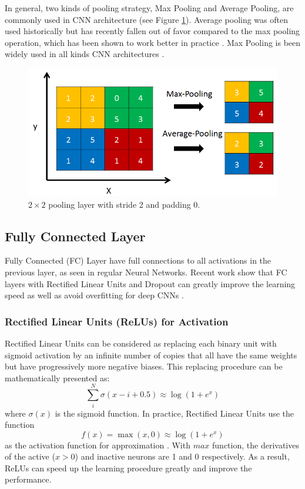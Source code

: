 In general, two kinds of pooling strategy, Max Pooling and Average Pooling, are commonly used in CNN architecture (see Figure \ref{fig:cnn:pool}). Average pooling was often used historically but has recently fallen out of favor compared to the max pooling operation, which has been shown to work better in practice \cite{malmaud2015s} \cite{szegedy2014going}. Max Pooling is been widely used in all kinds CNN architectures \cite{boureau2010theoretical} \cite{yang2009linear}. 
\begin{figure}
	\centering
	\includegraphics[scale=.8]{cnn/fig/pool.png}
	\caption{$2\times2$ pooling layer with stride 2 and padding 0.}\label{fig:cnn:pool}
\end{figure}

\subsection{Fully Connected Layer}
Fully Connected (FC) Layer have full connections to all activations in the previous layer, as seen in regular Neural Networks. Recent work show that FC layers with Rectified Linear Units and Dropout can greatly improve the learning speed as well as avoid overfitting for deep CNNs \cite{hinton2012improving} \cite{nair2010rectified}.
\subsubsection{Rectified Linear Units (ReLUs) for Activation}
Rectified Linear Units can be considered as replacing each binary unit with sigmoid activation by an infinite number of copies that all have the same weights but have progressively more negative biases. This replacing procedure can be mathematically presented as:
\begin{equation}
\sum\limits_i^N {\sigma (x - i + 0.5)}  \approx \log (1 + {e^x})
\end{equation}
where $\sigma(x)$ is the sigmoid function. In practice, Rectified Linear Units use the function 
\begin{equation}
f(x) = \max(x,0)  \approx \log (1 + {e^x})
\end{equation}\label{eq:cnn:relu}
as the activation function for approximation \cite{jarrett2009best}. With $max$ function, the derivatives of the active ($x>0$) and inactive neurons are 1 and 0 respectively.  As a result, ReLUs can speed up the learning procedure greatly and improve the performance.
